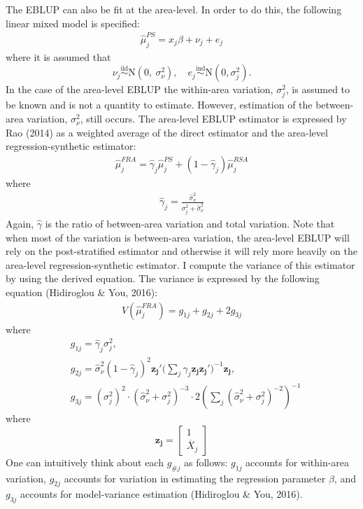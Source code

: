 \documentclass[12pt,twoside]{reedthesis}
\begin{document}
The EBLUP can also be fit at the area-level. In order to do this, the following linear mixed model is specified:
\begin{align}
\hat\mu_{j}^{PS} = x_j \beta + \nu_j + e_j \label{eq:area-mod}
\end{align}
where it is assumed that
\[
 \newcommand\myeq{\stackrel{\mathclap{\normalfont\mbox{s}}}{~}}
\nu_j \stackrel{\text{iid}}{\sim} \text{N}(0,~ \sigma^2_{\nu}), \quad e_{j} \stackrel{\text{ind}}{\sim}\text{N}(0, \sigma^2_j).
\]
In the case of the area-level EBLUP the within-area variation, \(\sigma^2_j\), is assumed to be known and is not a quantity to estimate. However, estimation of the between-area variation, \(\sigma_\nu^2\), still occurs. The area-level EBLUP estimator is expressed by Rao (2014) as a weighted average of the direct estimator and the area-level regression-synthetic estimator:
\begin{align}
\hat \mu_j^{FRA} = \hat\gamma_j \hat\mu_j^{PS} + (1 - \hat\gamma_j) \hat\mu_j^{RSA} \label{eq:eblup-area-weight}
\end{align}
where
\begin{align}
\hat \gamma_j = \frac{\hat \sigma_\nu^2}{\sigma^2_j + \hat\sigma_\nu^2}
\end{align}
Again, \(\hat\gamma\) is the ratio of between-area variation and total variation. Note that when most of the variation is between-area variation, the area-level EBLUP will rely on the post-stratified estimator and otherwise it will rely more heavily on the area-level regression-synthetic estimator. I compute the variance of this estimator by using the derived equation. The variance is expressed by the following equation (Hidiroglou \& You, 2016):
\begin{align}
\hat V(\hat\mu_j^{FRA}) = g_{1j} + g_{2j} + 2g_{3j}
\end{align}
where
\begin{align*}
&g_{1j} = \hat\gamma_j \sigma^2_j, \\
&g_{2j} = \hat\sigma^2_\nu (1 - \hat\gamma_j)^2 \mathbf{z_j'} \Big(\sum_{j} \hat\gamma_j \mathbf{z_j} \mathbf{z_j'}\Big)^{-1} \mathbf{z_j}, \\
&g_{3j} = (\sigma^2_j)^2 \cdot (\hat\sigma^2_\nu + \sigma^2_j)^{-3} \cdot 2(\sum_{j} (\hat\sigma^2_\nu + \sigma^2_j)^{-2})^{-1}
\end{align*}
where
\[
\mathbf{z_j} = \begin{bmatrix}
1 \\ \overline X_j
\end{bmatrix}
\]
One can intuitively think about each \(g_{\#j}\) as follows: \(g_{1j}\) accounts for within-area variation, \(g_{2j}\) accounts for variation in estimating the regression parameter \(\beta\), and \(g_{3j}\) accounts for model-variance estimation (Hidiroglou \& You, 2016).
\end{document}
